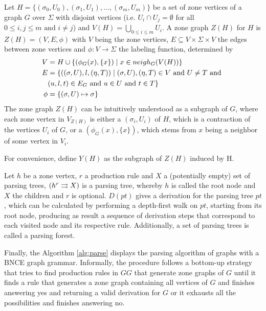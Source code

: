 \documentclass[]{report}
\begin{document}
\begin{definition}
	Let $H = \{(\sigma_0,U_0),(\sigma_1,U_1),\dots,(\sigma_m,U_m)\}$ be a set of zone vertices of a graph $G$ over $\Sigma$ with disjoint vertices (i.e. $U_i \cap U_j = \emptyset$ for all $0 \leq i,j \leq m \text{ and } i \neq j$) and $V(H) = \bigcup_{0 \leq i \leq m}{U_i}$. A zone graph $Z(H)$ for $H$ is $Z(H) = (V, E, \phi)$ with $V$ being the zone vertices, $E \subseteq V \times \Sigma \times V$ the edges between zone vertices and $\phi: V \to \Sigma$ the labeling function, determined by
	\begin{align*}
		V & = H \cup \{(\phi_G(x),\{x\}) \; | \; x \in neigh_G(V(H)) \}\\
		E & = \{((\sigma,U),l,(\eta,T)) \; | \; (\sigma,U),(\eta,T) \in V \text{ and } U \neq T \text{ and } \\
		& (u,l,t) \in E_G \text{ and } u \in U \text{ and } t \in T\} \\
		\phi & = \{(\sigma,U) \mapsto \sigma\}
	\end{align*}
	The zone graph $Z(H)$ can be intuitively understood as a subgraph of $G$, where each zone vertex in $V_{Z(H)}$ is either a $(\sigma_i,U_i)$ of $H$, which is a contraction of the vertices $U_i$ of $G$, or a $(\phi_G(x),\{x\})$, which stems from $x$ being a neighbor of some vertex in $V_i$.
	
	For convenience, define $Y(H)$ as the subgraph of $Z(H)$ induced by H.
\end{definition}

\begin{definition}
	Let $h$ be a zone vertex, $r$ a production rule and $X$ a (potentially empty) set of parsing trees, $\ptree{h}{r}{X}$ is a parsing tree, whereby $h$ is called the root node and $X$ the children and $r$ is optional. $D(pt)$ gives a derivation for the parsing tree $pt$, which can be calculated by performing a depth-first walk on $pt$, starting from its root node, producing as result a sequence of derivation steps that correspond to each visited node and its respective rule. Additionally, a set of parsing trees is called a parsing forest.
\end{definition}

Finally, the Algorithm \ref{alg:parse} displays the parsing algorithm of graphs with a BNCE graph grammar. Informally, the procedure follows a bottom-up strategy that tries to find production rules in $GG$ that generate zone graphs of $G$ until it finds a rule that generates a zone graph containing all vertices of $G$ and finishes answering yes and returning a valid derivation for $G$ or it exhausts all the possibilities and finishes answering no.
\end{document}
